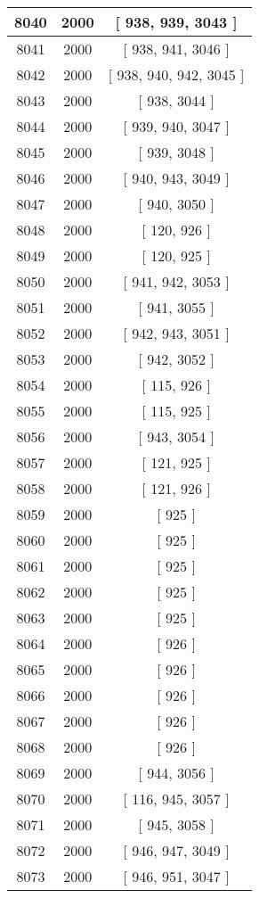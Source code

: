 \begin{center}
\begin{longtable}[H]{|| c c c ||}
\hline
8040 & 2000 & [ 938, 939, 3043 ] \\ 
\hline
8041 & 2000 & [ 938, 941, 3046 ] \\ 
\hline
8042 & 2000 & [ 938, 940, 942, 3045 ] \\ 
\hline
8043 & 2000 & [ 938, 3044 ] \\ 
\hline
8044 & 2000 & [ 939, 940, 3047 ] \\ 
\hline
8045 & 2000 & [ 939, 3048 ] \\ 
\hline
8046 & 2000 & [ 940, 943, 3049 ] \\ 
\hline
8047 & 2000 & [ 940, 3050 ] \\ 
\hline
8048 & 2000 & [ 120, 926 ] \\ 
\hline
8049 & 2000 & [ 120, 925 ] \\ 
\hline
8050 & 2000 & [ 941, 942, 3053 ] \\ 
\hline
8051 & 2000 & [ 941, 3055 ] \\ 
\hline
8052 & 2000 & [ 942, 943, 3051 ] \\ 
\hline
8053 & 2000 & [ 942, 3052 ] \\ 
\hline
8054 & 2000 & [ 115, 926 ] \\ 
\hline
8055 & 2000 & [ 115, 925 ] \\ 
\hline
8056 & 2000 & [ 943, 3054 ] \\ 
\hline
8057 & 2000 & [ 121, 925 ] \\ 
\hline
8058 & 2000 & [ 121, 926 ] \\ 
\hline
8059 & 2000 & [ 925 ] \\ 
\hline
8060 & 2000 & [ 925 ] \\ 
\hline
8061 & 2000 & [ 925 ] \\ 
\hline
8062 & 2000 & [ 925 ] \\ 
\hline
8063 & 2000 & [ 925 ] \\ 
\hline
8064 & 2000 & [ 926 ] \\ 
\hline
8065 & 2000 & [ 926 ] \\ 
\hline
8066 & 2000 & [ 926 ] \\ 
\hline
8067 & 2000 & [ 926 ] \\ 
\hline
8068 & 2000 & [ 926 ] \\ 
\hline
8069 & 2000 & [ 944, 3056 ] \\ 
\hline
8070 & 2000 & [ 116, 945, 3057 ] \\ 
\hline
8071 & 2000 & [ 945, 3058 ] \\ 
\hline
8072 & 2000 & [ 946, 947, 3049 ] \\ 
\hline
8073 & 2000 & [ 946, 951, 3047 ] \\ 

\end{longtable}
\end{center}
